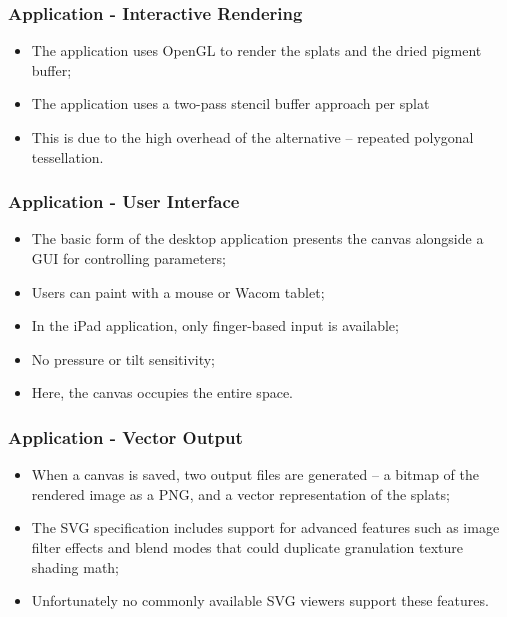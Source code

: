 \documentclass{beamer}
\begin{document}
\begin{frame}
    \frametitle{Application - Interactive Rendering}
    \begin{itemize}
        \item The application uses OpenGL to render the splats and the dried 
        pigment buffer;
        \item The application uses a two-pass stencil buffer approach per splat
        \item This is due to the high overhead of the alternative -- repeated
        polygonal tessellation.
    \end{itemize}
\end{frame}

\begin{frame}
    \frametitle{Application - User Interface}
    \begin{itemize}
        \item The basic form of the desktop application presents the canvas
        alongside a GUI for controlling parameters;
        \item Users can paint with a mouse or Wacom tablet;
        \item In the iPad application, only finger-based input is available;
        \item No pressure or tilt sensitivity;
        \item Here, the canvas occupies the entire space.
    \end{itemize}
\end{frame}

\begin{frame}
    \frametitle{Application - Vector Output}
    \begin{itemize}
        \item When a canvas is saved, two output files are generated -- a
        bitmap of the rendered image as a PNG, and a vector representation of
        the splats;
        \item The SVG speciﬁcation includes support for advanced features
        such as image ﬁlter effects and blend modes that could duplicate
        granulation texture shading math;
        \item Unfortunately no commonly available SVG viewers support these
        features.
    \end{itemize}
\end{frame}
\end{document}
